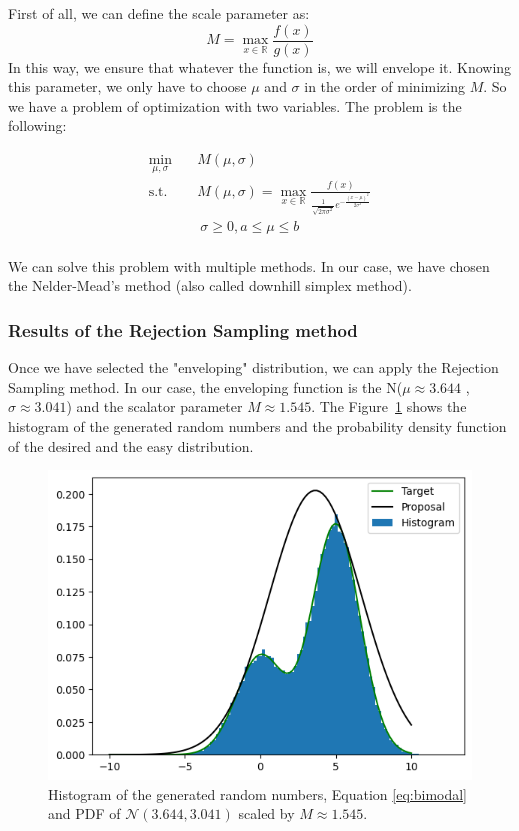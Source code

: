 \documentclass{article}
\begin{document}
First of all, we can define the scale parameter as:
\begin{equation}
	M = \max_{x \in \mathbb{R}} \frac{f(x)}{g(x)}
\end{equation}
In this way, we ensure that whatever the function is, we will envelope it. Knowing this parameter, we only have to choose \(\mu\) and \(\sigma\) in the order of minimizing \(M\). So we have a problem of optimization with two variables. The problem is the following:

\begin{equation}
	\begin{aligned}
		\min_{\mu, \sigma} \quad & M(\mu,\sigma) \\
		\textrm{s.t.} \quad & M(\mu,\sigma) = \max_{x \in \mathbb{R}} \frac{f(x)}{\frac{1}{\sqrt{2\pi\sigma^2}}e^{-\frac{(x-\mu)^2}{2\sigma^2}}} \\
		\quad &\ \sigma \geq 0, a \leq \mu \leq b \\
	\end{aligned}
	\label{eq:problemmaxmin}
\end{equation}

We can solve this problem with multiple methods. In our case, we have chosen the Nelder-Mead's method (also called downhill simplex method).

\subsubsection{Results of the Rejection Sampling method}
\label{sec:results_rejection_sampling}

Once we have selected the "enveloping" distribution, we can apply the Rejection Sampling method. In our case, the enveloping function is the N(\(\mu \approx 3.644\) ,\(\sigma \approx 3.041\)) and the scalator parameter \(M \approx 1.545\). The Figure~\ref{fig:rejectionmethod} shows the histogram of the generated random numbers and the probability density function of the desired and the easy distribution.

\begin{figure}[H]
	\centering
	\includegraphics[width=0.5\linewidth]{./Figures/AcceptanceRejection/hist.png}
	\caption{Histogram of the generated random numbers, Equation \eqref{eq:bimodal} and PDF of \(\mathcal{N}(3.644,3.041)\) scaled by \(M \approx 1.545\).}
	\label{fig:rejectionmethod}
\end{figure}
\end{document}
